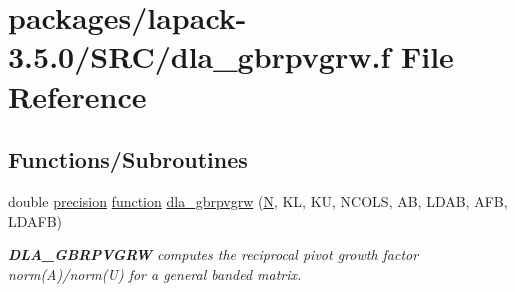 \hypertarget{dla__gbrpvgrw_8f}{}\section{packages/lapack-\/3.5.0/\+S\+R\+C/dla\+\_\+gbrpvgrw.f File Reference}
\label{dla__gbrpvgrw_8f}
\subsection*{Functions/\+Subroutines}
\begin{DoxyCompactItemize}
\item 
double \hyperlink{numinquire_8h_a2c8e616467665d0b2814d4c1589ba74e}{precision} \hyperlink{afunc_8m_a7b5e596df91eadea6c537c0825e894a7}{function} \hyperlink{group__doubleGBcomputational_ga1770de12748787eb6d08a40771f502b5}{dla\+\_\+gbrpvgrw} (\hyperlink{polmisc_8c_a0240ac851181b84ac374872dc5434ee4}{N}, K\+L, K\+U, N\+C\+O\+L\+S, A\+B, L\+D\+A\+B, A\+F\+B, L\+D\+A\+F\+B)
\begin{DoxyCompactList}\small\item\em {\bfseries D\+L\+A\+\_\+\+G\+B\+R\+P\+V\+G\+R\+W} computes the reciprocal pivot growth factor norm(\+A)/norm(U) for a general banded matrix. \end{DoxyCompactList}\end{DoxyCompactItemize}
